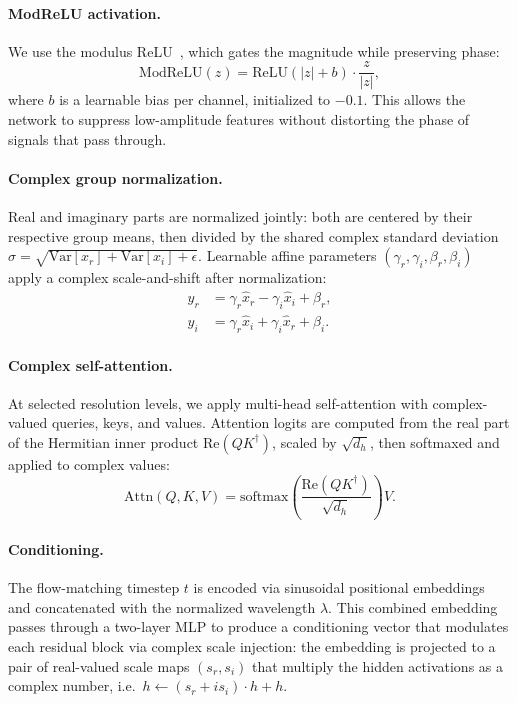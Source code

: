 \paragraph{ModReLU activation.}
We use the modulus ReLU~\cite{Arjovsky2016UnitaryRNN}, which gates the magnitude while
preserving phase:
\begin{equation}
    \mathrm{ModReLU}(z) = \mathrm{ReLU}(|z| + b) \cdot \frac{z}{|z|},
    \label{eq:modrelu}
\end{equation}
where $b$ is a learnable bias per channel, initialized to $-0.1$. This allows the network to suppress low-amplitude
features without distorting the phase of signals that pass through.

\paragraph{Complex group normalization.}
Real and imaginary parts are normalized jointly: both are centered by their
respective group means, then divided by the shared complex standard deviation $\sigma =
\sqrt{\mathrm{Var}[x_r]+\mathrm{Var}[x_i]+\epsilon}$. Learnable affine parameters $(\gamma_r, \gamma_i, \beta_r,
\beta_i)$ apply a complex scale-and-shift after normalization:
\begin{align}
    y_r &= \gamma_r \hat{x}_r - \gamma_i \hat{x}_i + \beta_r, \nonumber\\
    y_i &= \gamma_r \hat{x}_i + \gamma_i \hat{x}_r + \beta_i.
    \label{eq:complex_groupnorm}
\end{align}

\paragraph{Complex self-attention.}
At selected resolution levels, we apply multi-head self-attention with complex-valued
queries, keys, and values. Attention logits are computed from the real part of the Hermitian inner product
$\mathrm{Re}(QK^\dagger)$, scaled by $\sqrt{d_h}$, then softmaxed and applied to complex values:
\begin{equation}
    \mathrm{Attn}(Q,K,V) = \mathrm{softmax}\!\left(\frac{\mathrm{Re}(QK^\dagger)}{\sqrt{d_h}}\right) V.
    \label{eq:complex_attn}
\end{equation}

\paragraph{Conditioning.}
The flow-matching timestep $t$ is encoded via sinusoidal positional embeddings and concatenated
with the normalized wavelength $\lambda$. This combined embedding passes through a two-layer MLP to produce a
conditioning vector that modulates each residual block via complex scale injection: the embedding is projected to a
pair of real-valued scale maps $(s_r, s_i)$ that multiply the hidden activations as a complex number, i.e.\
$h \leftarrow (s_r + is_i) \cdot h + h$.

